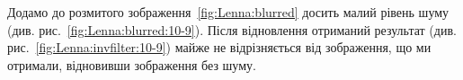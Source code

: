 \documentclass{diploma}
\begin{document}
      \begin{figure}[ht]
        \hfill
        \hfill
      \end{figure}

      Додамо до розмитого зображення~\ref{fig:Lenna:blurred} досить малий
      рівень шуму (див. рис.~\ref{fig:Lenna:blurred:10-9}).
      Після відновлення отриманий результат (див.
      рис.~\ref{fig:Lenna:invfilter:10-9}) майже не відрізняється від
      зображення, що ми отримали, відновивши зображення без шуму.
\end{document}
